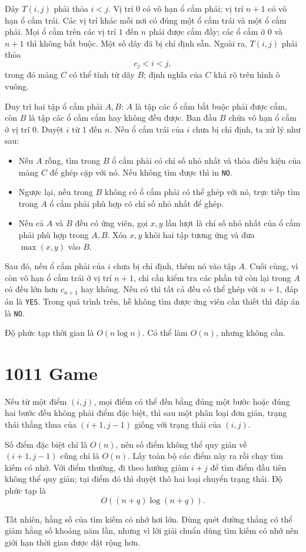 \documentclass[11pt]{article}
\begin{document}
Dây $T(i,j)$ phải thỏa $i<j$. Vị trí $0$ có vô hạn ổ cắm phải; vị trí $n+1$
có vô hạn ổ cắm trái. Các vị trí khác mỗi nơi có đúng một ổ cắm trái và một
ổ cắm phải. Mọi ổ cắm trên các vị trí $1$ đến $n$ phải được cắm đầy; các ổ
cắm ở $0$ và $n+1$ thì không bắt buộc. Một số dây đã bị chỉ định sẵn. Ngoài
ra, $T(i,j)$ phải thỏa
\[
  c_j<i<j,
\]
trong đó mảng $C$ có thể tính từ dãy $B$; định nghĩa của $C$ khá rõ trên
hình ô vuông.

Duy trì hai tập ổ cắm phải $A,B$: $A$ là tập các ổ cắm bắt buộc phải được
cắm, còn $B$ là tập các ổ cắm cắm hay không đều được. Ban đầu $B$ chứa vô hạn
ổ cắm ở vị trí $0$. Duyệt $i$ từ $1$ đến $n$. Nếu ổ cắm trái của $i$ chưa bị
chỉ định, ta xử lý như sau:
\begin{itemize}
  \item Nếu $A$ rỗng, tìm trong $B$ ổ cắm phải có chỉ số nhỏ nhất và thỏa
  điều kiện của mảng $C$ để ghép cặp với nó. Nếu không tìm được thì in
  \texttt{NO}.
  \item Ngược lại, nếu trong $B$ không có ổ cắm phải có thể ghép với nó, trực
  tiếp tìm trong $A$ ổ cắm phải phù hợp có chỉ số nhỏ nhất để ghép.
  \item Nếu cả $A$ và $B$ đều có ứng viên, gọi $x,y$ lần lượt là chỉ số nhỏ
  nhất của ổ cắm phải phù hợp trong $A,B$. Xóa $x,y$ khỏi hai tập tương ứng
  và đưa $\max(x,y)$ vào $B$.
\end{itemize}

Sau đó, nếu ổ cắm phải của $i$ chưa bị chỉ định, thêm nó vào tập $A$. Cuối
cùng, vì còn vô hạn ổ cắm trái ở vị trí $n+1$, chỉ cần kiểm tra các phần tử
còn lại trong $A$ có đều lớn hơn $c_{n+1}$ hay không. Nếu có thì tất cả đều
có thể ghép với $n+1$, đáp án là \texttt{YES}. Trong quá trình trên, hễ không
tìm được ứng viên cần thiết thì đáp án là \texttt{NO}.

Độ phức tạp thời gian là $O(n\log n)$. Có thể làm $O(n)$, nhưng không cần.

\section{1011 Game}

Nếu từ một điểm $(i,j)$, mọi điểm có thể đến bằng đúng một bước hoặc đúng hai
bước đều không phải điểm đặc biệt, thì sau một phân loại đơn giản, trạng thái
thắng thua của $(i+1,j-1)$ giống với trạng thái của $(i,j)$.

Số điểm đặc biệt chỉ là $O(n)$, nên số điểm không thể quy giản về
$(i+1,j-1)$ cũng chỉ là $O(n)$. Lấy toàn bộ các điểm này ra rồi chạy tìm kiếm
có nhớ. Với điểm thường, đi theo hướng giảm $i+j$ để tìm điểm đầu tiên không
thể quy giản; tại điểm đó thì duyệt thô hai loại chuyển trạng thái. Độ phức
tạp là
\[
  O((n+q)\log(n+q)).
\]

Tất nhiên, hằng số của tìm kiếm có nhớ hơi lớn. Dùng quét đường thẳng có thể
giảm hằng số khoảng năm lần, nhưng vì lời giải chuẩn dùng tìm kiếm có nhớ nên
giới hạn thời gian được đặt rộng hơn.
\end{document}
